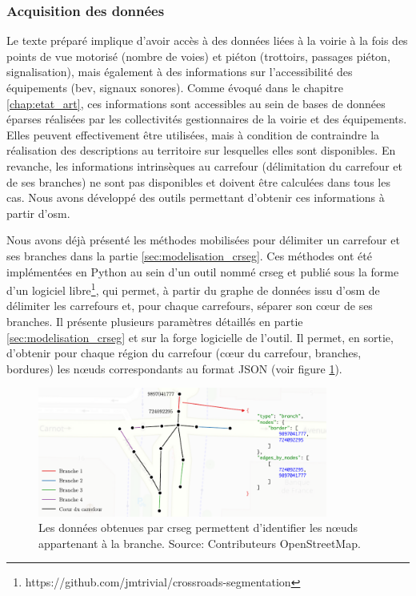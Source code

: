 \subsubsection{Acquisition des données}

Le texte préparé implique d'avoir accès à des données liées à la voirie à la fois des points de vue motorisé (nombre de voies) et piéton (trottoirs, passages piéton, signalisation), mais également à des informations sur l'accessibilité des équipements (\gls{bev}, signaux sonores). Comme évoqué dans le chapitre \ref{chap:etat_art}, ces informations sont accessibles au sein de bases de données éparses réalisées par les collectivités gestionnaires de la voirie et des équipements. Elles peuvent effectivement être utilisées, mais à condition de contraindre la réalisation des descriptions au territoire sur lesquelles elles sont disponibles. En revanche, les informations intrinsèques au carrefour (délimitation du carrefour et de ses branches) ne sont pas disponibles et doivent être calculées dans tous les cas. Nous avons développé des outils permettant d'obtenir ces informations à partir d'\gls{osm}.

\newpar{}

Nous avons déjà présenté les méthodes mobilisées pour délimiter un carrefour et ses branches dans la partie \ref{sec:modelisation_crseg}. Ces méthodes ont été implémentées en Python au sein d'un outil nommé crseg et publié sous la forme d'un logiciel libre\footnote{https://github.com/jmtrivial/crossroads-segmentation}, qui permet, à partir du graphe de données issu d'\gls{osm} de délimiter les carrefours et, pour chaque carrefours, séparer son cœur de ses branches. Il présente plusieurs paramètres détaillés en partie \ref{sec:modelisation_crseg} et sur la forge logicielle de l'outil. Il permet, en sortie, d'obtenir pour chaque région du carrefour (cœur du carrefour, branches, bordures) les nœuds correspondants au format JSON (voir figure \ref{fig:experimentation_crseg_json}).

\begin{figure}[ht]
    \centering
    \includegraphics[width=0.85\textwidth]{images/experimentation/donnees_crseg.pdf}
    \caption[Données produites par crseg]{Les données obtenues par crseg permettent d'identifier les nœuds appartenant à la branche. Source: Contributeurs OpenStreetMap.}
    \label{fig:experimentation_crseg_json}
\end{figure}

